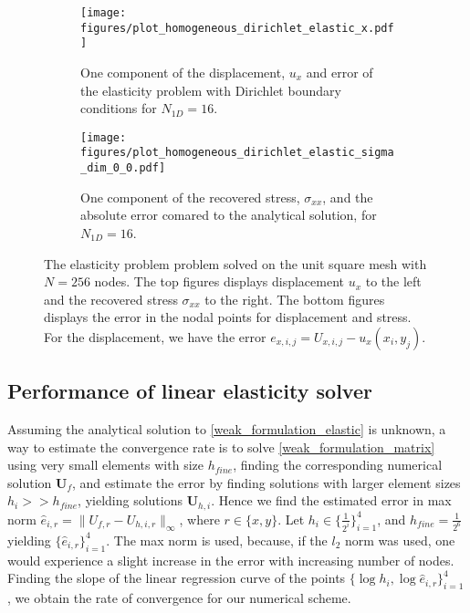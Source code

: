 \documentclass[5pt,a4paper,english]{elsarticle}%
\begin{document}
\begin{figure}[ht]   
    \begin{subfigure}[b]{0.5\textwidth}
        \centering
            \texttt{[image: figures/plot\_homogeneous\_dirichlet\_elastic\_x.pdf]}
            \caption{One component of the displacement, $u_x$ and error of the elasticity problem with Dirichlet boundary conditions for $N_{1D} = 16$.}
        \label{solution-error-dirichlet-elastic-x}
    \end{subfigure}\qquad
    \begin{subfigure}[b]{0.5\textwidth}
        \centering
            \texttt{[image: figures/plot\_homogeneous\_dirichlet\_elastic\_sigma\_dim\_0\_0.pdf]}
            \caption{One component of the recovered stress, $\sigma_{xx}$, and the absolute error comared to the analytical solution, for $N_{1D} = 16$.}
        \label{solution-error-dirichlet-elastic-sigma-xx}
    \end{subfigure}

    \caption{The elasticity problem problem solved on the unit square mesh with $N = 256$ nodes. The top figures displays displacement $u_x$ to the left and the recovered stress $\sigma_{xx}$ to the right. The bottom figures displays the error in the nodal points for displacement and stress. For the displacement, we have the error $e_{x,i,j} = U_{x,i,j} - u_x(x_i,y_j)$.}
\end{figure}

\subsection{Performance of linear elasticity solver}
Assuming the analytical solution to \eqref{weak_formulation_elastic} is unknown, a way to estimate the convergence rate is to solve \eqref{weak_formulation_matrix} using very small elements with size $h_{fine}$, finding the corresponding numerical solution $\bm U_f$, and estimate the error by finding solutions with larger element sizes $h_i >> h_{fine}$, yielding solutions $\bm U_{h,i}$. Hence we find the estimated error in max norm $\hat e_{i,r} = \|U_{f,r} - U_{h,i,r} \|_{\infty}$, where $r\in \{x,y\}$. Let $h_i \in \{\frac{1}{2^i}\}_{i=1}^4$, and $h_{fine} = \frac{1}{2^6}$ yielding $\{\hat e_{i,r}\}_{i=1}^4$. The max norm is used, because, if the $l_2$ norm was used, one would experience a slight increase in the error with increasing number of nodes. Finding the slope of the linear regression curve of the points $\{\log h_i,\log  \hat e_{i,r}\}_{i=1}^4$, we obtain the rate of convergence for our numerical scheme. 
\end{document}
